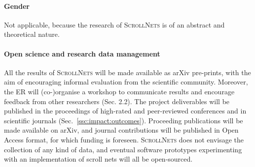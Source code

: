 \documentclass[11pt]{msca-pf}
\newcommand{\proj}{\small\textsc{ScrollNets}}
\begin{document}
\paragraph{Gender}
Not applicable, because the research of {\proj} is of an abstract and theoretical nature.

\paragraph{Open science and research data management}
All the results of {\proj} will be made available as arXiv pre-prints, with the aim of encouraging
informal evaluation from the scientific community. Moreover, the ER will (co-)organise a workshop to
communicate results and encourage feedback from other researchers (Sec. 2.2). The project
deliverables will be published in the proceedings of high-rated and peer-reviewed conferences and in
scientific journals (Sec.~\ref{ssc:impact:outcomes}). Proceeding publications will be made
available on arXiv, and journal contributions will be published in Open Access format, for which
funding is foreseen. {\proj} does not envisage the collection of any kind of data, and eventual
software prototypes experimenting with an implementation of scroll nets will all be open-sourced.




\end{document}
